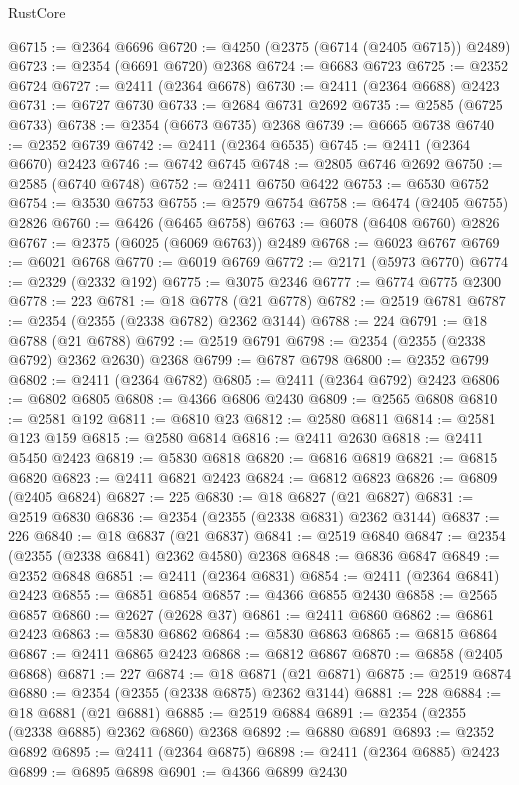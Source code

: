 \begin{lexlean}{RustCore}
\begin{coremodule}
@6715 := @2364 @6696
@6720 := @4250 (@2375 (@6714 (@2405 @6715)) @2489)
@6723 := @2354 (@6691 @6720) @2368
@6724 := @6683 @6723
@6725 := @2352 @6724
@6727 := @2411 (@2364 @6678)
@6730 := @2411 (@2364 @6688) @2423
@6731 := @6727 @6730
@6733 := @2684 @6731 @2692
@6735 := @2585 (@6725 @6733)
@6738 := @2354 (@6673 @6735) @2368
@6739 := @6665 @6738
@6740 := @2352 @6739
@6742 := @2411 (@2364 @6535)
@6745 := @2411 (@2364 @6670) @2423
@6746 := @6742 @6745
@6748 := @2805 @6746 @2692
@6750 := @2585 (@6740 @6748)
@6752 := @2411 @6750 @6422
@6753 := @6530 @6752
@6754 := @3530 @6753
@6755 := @2579 @6754
@6758 := @6474 (@2405 @6755) @2826
@6760 := @6426 (@6465 @6758)
@6763 := @6078 (@6408 @6760) @2826
@6767 := @2375 (@6025 (@6069 @6763)) @2489
@6768 := @6023 @6767
@6769 := @6021 @6768
@6770 := @6019 @6769
@6772 := @2171 (@5973 @6770)
@6774 := @2329 (@2332 @192)
@6775 := @3075 @2346
@6777 := @6774 @6775 @2300
@6778 := 223
@6781 := @18 @6778 (@21 @6778)
@6782 := @2519 @6781
@6787 := @2354 (@2355 (@2338 @6782) @2362 @3144)
@6788 := 224
@6791 := @18 @6788 (@21 @6788)
@6792 := @2519 @6791
@6798 := @2354 (@2355 (@2338 @6792) @2362 @2630) @2368
@6799 := @6787 @6798
@6800 := @2352 @6799
@6802 := @2411 (@2364 @6782)
@6805 := @2411 (@2364 @6792) @2423
@6806 := @6802 @6805
@6808 := @4366 @6806 @2430
@6809 := @2565 @6808
@6810 := @2581 @192
@6811 := @6810 @23
@6812 := @2580 @6811
@6814 := @2581 @123 @159
@6815 := @2580 @6814
@6816 := @2411 @2630
@6818 := @2411 @5450 @2423
@6819 := @5830 @6818
@6820 := @6816 @6819
@6821 := @6815 @6820
@6823 := @2411 @6821 @2423
@6824 := @6812 @6823
@6826 := @6809 (@2405 @6824)
@6827 := 225
@6830 := @18 @6827 (@21 @6827)
@6831 := @2519 @6830
@6836 := @2354 (@2355 (@2338 @6831) @2362 @3144)
@6837 := 226
@6840 := @18 @6837 (@21 @6837)
@6841 := @2519 @6840
@6847 := @2354 (@2355 (@2338 @6841) @2362 @4580) @2368
@6848 := @6836 @6847
@6849 := @2352 @6848
@6851 := @2411 (@2364 @6831)
@6854 := @2411 (@2364 @6841) @2423
@6855 := @6851 @6854
@6857 := @4366 @6855 @2430
@6858 := @2565 @6857
@6860 := @2627 (@2628 @37)
@6861 := @2411 @6860
@6862 := @6861 @2423
@6863 := @5830 @6862
@6864 := @5830 @6863
@6865 := @6815 @6864
@6867 := @2411 @6865 @2423
@6868 := @6812 @6867
@6870 := @6858 (@2405 @6868)
@6871 := 227
@6874 := @18 @6871 (@21 @6871)
@6875 := @2519 @6874
@6880 := @2354 (@2355 (@2338 @6875) @2362 @3144)
@6881 := 228
@6884 := @18 @6881 (@21 @6881)
@6885 := @2519 @6884
@6891 := @2354 (@2355 (@2338 @6885) @2362 @6860) @2368
@6892 := @6880 @6891
@6893 := @2352 @6892
@6895 := @2411 (@2364 @6875)
@6898 := @2411 (@2364 @6885) @2423
@6899 := @6895 @6898
@6901 := @4366 @6899 @2430

\end{coremodule}
\end{lexlean}
